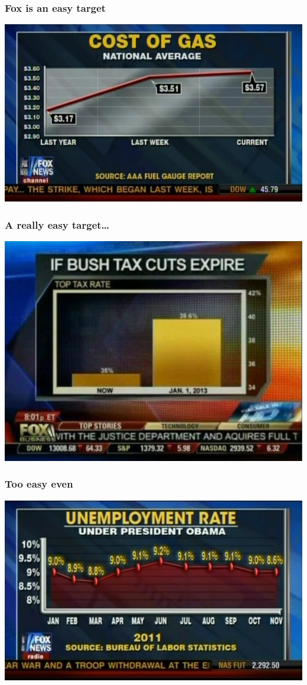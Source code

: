 \documentclass{beamer}
\begin{document}
\begin{frame}
  \frametitle{Fox is an easy target}
  \includegraphics[width = \textwidth, keepaspectratio = true]{figure/fox_scale}
\end{frame}

\begin{frame}
  \frametitle{A really easy target\ldots}
  \includegraphics[width = \textwidth, keepaspectratio = true]{figure/fox_nodiff}
\end{frame}

\begin{frame}
  \frametitle{Too easy even}
  \includegraphics[width = \textwidth, keepaspectratio = true]{figure/fox_lying}
\end{frame}
\end{document}
